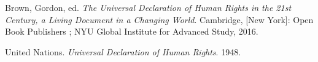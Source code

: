 \documentclass[
  ngerman,
  american,
  letterpaper,
  DIV=11,
  numbers=noendperiod]{scrartcl}
\newlength{\cslhangindent}
\newenvironment{CSLReferences}[2] %
 {\begin{list}{}{%
  \setlength{\itemindent}{0pt}
  \setlength{\leftmargin}{0pt}
  \setlength{\parsep}{0pt}
  \ifodd #1
   \setlength{\leftmargin}{\cslhangindent}
   \setlength{\itemindent}{-1\cslhangindent}
  \fi
  \setlength{\itemsep}{#2\baselineskip}}}
 {\end{list}}
\begin{document}
\protect{}\label{refs}
\begin{CSLReferences}{1}{1}
Brown, Gordon, ed. \emph{The {Universal} {Declaration} of {Human}
{Rights} in the 21st Century, a Living Document in a Changing World}.
Cambridge, {[}New York{]}: Open Book Publishers ; NYU Global Institute
for Advanced Study, 2016.

United Nations. \emph{Universal Declaration of Human Rights}. 1948.

\end{CSLReferences}
\end{document}
